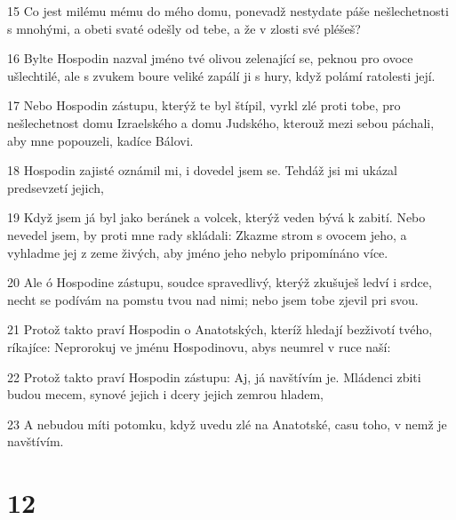 \par 15 Co jest milému mému do mého domu, ponevadž nestydate páše nešlechetnosti s mnohými, a obeti svaté odešly od tebe, a že v zlosti své pléšeš?
\par 16 Bylte Hospodin nazval jméno tvé olivou zelenající se, peknou pro ovoce ušlechtilé, ale s zvukem boure veliké zapálí ji s hury, když polámí ratolesti její.
\par 17 Nebo Hospodin zástupu, kterýž te byl štípil, vyrkl zlé proti tobe, pro nešlechetnost domu Izraelského a domu Judského, kterouž mezi sebou páchali, aby mne popouzeli, kadíce Bálovi.
\par 18 Hospodin zajisté oznámil mi, i dovedel jsem se. Tehdáž jsi mi ukázal predsevzetí jejich,
\par 19 Když jsem já byl jako beránek a volcek, kterýž veden bývá k zabití. Nebo nevedel jsem, by proti mne rady skládali: Zkazme strom s ovocem jeho, a vyhladme jej z zeme živých, aby jméno jeho nebylo pripomínáno více.
\par 20 Ale ó Hospodine zástupu, soudce spravedlivý, kterýž zkušuješ ledví i srdce, necht se podívám na pomstu tvou nad nimi; nebo jsem tobe zjevil pri svou.
\par 21 Protož takto praví Hospodin o Anatotských, kteríž hledají bezživotí tvého, ríkajíce: Neprorokuj ve jménu Hospodinovu, abys neumrel v ruce naší:
\par 22 Protož takto praví Hospodin zástupu: Aj, já navštívím je. Mládenci zbiti budou mecem, synové jejich i dcery jejich zemrou hladem,
\par 23 A nebudou míti potomku, když uvedu zlé na Anatotské, casu toho, v nemž je navštívím.

\chapter{12}

